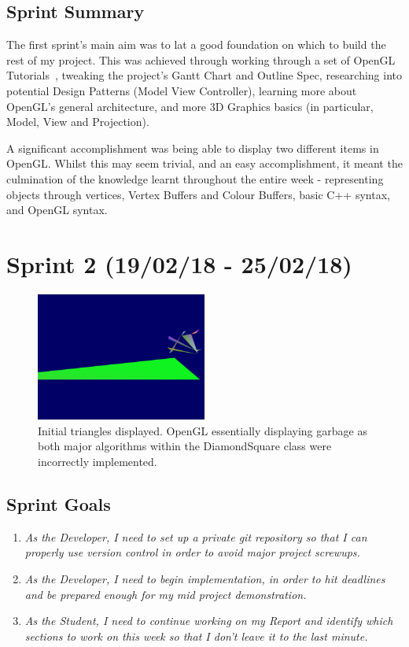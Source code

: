 \documentclass[a4paper,10pt]{report}
\begin{document}
\subsection{Sprint Summary}

The first sprint's main aim was to lat a good foundation on which to build the rest of my project. This was achieved through working through a set of OpenGL Tutorials~\cite{opengl_tutorial}, tweaking the project's Gantt Chart and Outline Spec, researching into potential Design Patterns (Model View Controller), learning more about OpenGL's general architecture, and more 3D Graphics basics (in particular, Model, View and Projection). \medskip

A significant accomplishment was being able to display two different items in OpenGL. Whilst this may seem trivial, and an easy accomplishment, it meant the culmination of the knowledge learnt throughout the entire week - representing objects through vertices, Vertex Buffers and Colour Buffers, basic C++ syntax, and OpenGL syntax.\medskip

\clearpage
\section{Sprint 2 (19/02/18 - 25/02/18)}

\begin{figure}[h!]
    \centering
  \includegraphics[width=0.5\textwidth]{Images/Sprint-Images/Sprint2-1.png}
 \caption{Initial triangles displayed. OpenGL essentially displaying garbage as both major algorithms within the DiamondSquare class were incorrectly implemented.}
 \label{fig:sprint2-1}
\end{figure}

\subsection{Sprint Goals}
\begin{enumerate}
    \item \textit{As the Developer, I need to set up a private git repository so that I can properly use version control in order to avoid major project screwups.
    }
    \item \textit{As the Developer, I need to begin implementation, in order to hit deadlines and be prepared enough for my mid project demonstration.}
    \item\textit{As the Student, I need to continue working on my Report and identify which sections to work on this week so that I don't leave it to the last minute.}
    
\end{enumerate}
\end{document}
